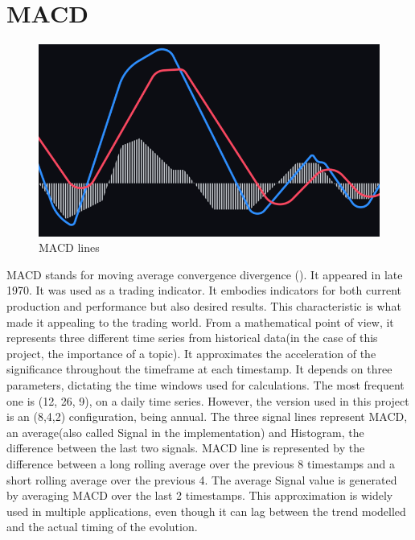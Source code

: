 \documentclass[12pt,MSc,a4paper,oneside]{muthesis}
\begin{document}
\section{MACD}

\begin{figure}[h]
  \centering
  \includegraphics[scale=0.55]{images/abstract/MACD Bin.png}
  \caption{MACD lines}
\end{figure}

MACD stands for moving average convergence divergence (\cite{wiki:macd}). It appeared in late 1970. It was used as a trading indicator. It embodies indicators for both current production and performance but also desired results. This characteristic is what made it appealing to the trading world. From a mathematical point of view, it represents three different time series from historical data(in the case of this project, the importance of a topic). It approximates the acceleration of the significance throughout the timeframe at each timestamp. It depends on three parameters, dictating the time windows used for calculations. The most frequent one is (12, 26, 9), on a daily time series. However, the version used in this project is an (8,4,2) configuration, being annual. The three signal lines represent MACD, an average(also called Signal in the implementation) and Histogram, the difference between the last two signals. MACD line is represented by the difference between a long rolling average over the previous 8 timestamps and a short rolling average over the previous 4. The average Signal value is generated by averaging MACD over the last 2 timestamps.
This approximation is widely used in multiple applications, even though it can lag between the trend modelled and the actual timing of the evolution.
\end{document}
